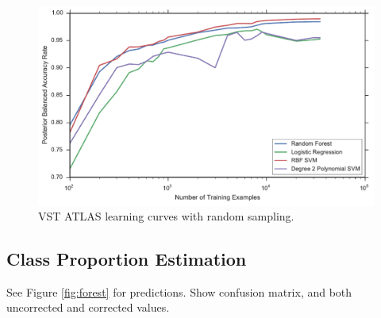 \begin{figure}[p]
	\centering
	\includegraphics[width=\textwidth]{figures/4_expt1/vstatlas_learning_curves}
	\caption[Learning curves with random sampling in VST ATLAS]{
		VST ATLAS learning curves with random sampling.}
	\label{fig:vstatlas_learning_curves}
\end{figure}





\subsection{Class Proportion Estimation}
See Figure \ref{fig:forest} for predictions. Show confusion matrix, and
both uncorrected and corrected values.

